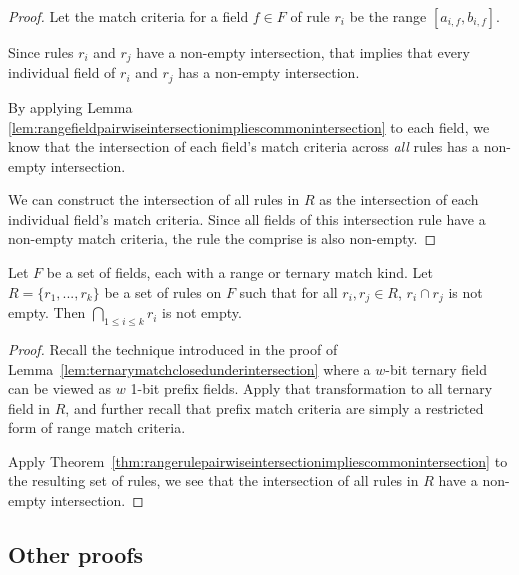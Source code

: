 \documentclass[acmsmall]{acmart}
\begin{document}
\begin{proof}
Let the match criteria for a field $f \in F$ of rule $r_i$ be
the range $[a_{i,f}, b_{i,f}]$.

Since rules $r_i$ and $r_j$ have a non-empty intersection,
that implies that every individual field of $r_i$ and $r_j$
has a non-empty intersection.

By applying Lemma~
\ref{lem:rangefieldpairwiseintersectionimpliescommonintersection}
to each field, we know that the intersection of each field's
match criteria across {\em all} rules has a non-empty intersection.

We can construct the intersection of all rules in $R$ as
the intersection of each individual field's match criteria.
Since all fields of this intersection rule have a non-empty
match criteria, the rule the comprise is also non-empty.
\end{proof}


\begin{theorem}
\label{thm:ternaryrulepairwiseintersectionimpliescommonintersection}
Let $F$ be a set of fields, each with a range or ternary match kind.
Let $R = \{r_1, ..., r_k\}$ be a set of rules on $F$
such that for all $r_i, r_j \in R$, $r_i \cap r_j$ is not empty.
Then $\bigcap_{1 \leq i \leq k} r_i$ is not empty.
\end{theorem}

\begin{proof}
Recall the technique introduced in the proof of
Lemma~\ref{lem:ternarymatchclosedunderintersection}
where a $w$-bit ternary field can be viewed as
$w$ 1-bit prefix fields.
Apply that transformation to all ternary field in $R$,
and further recall that prefix match criteria are simply a restricted
form of range match criteria.

Apply Theorem~\ref{thm:rangerulepairwiseintersectionimpliescommonintersection}
to the resulting set of rules,
we see that the intersection of all rules in $R$
have a non-empty intersection.
\end{proof}

\begin{theorem}
\label{thm:addnewfilterpreservesclosedunderintersection}
\end{theorem}


\subsection{Other proofs}
\end{document}
